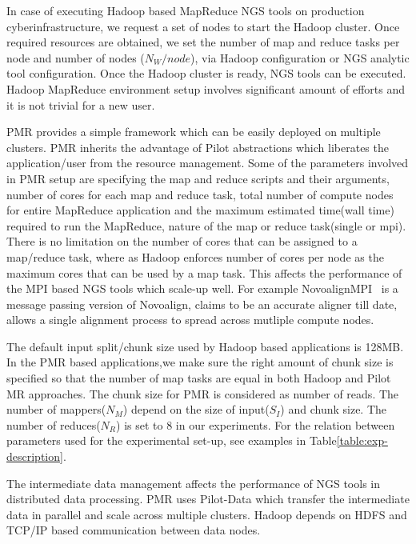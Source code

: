 \documentclass{acm_proc_article-sp}
\begin{document}
In case of executing Hadoop based MapReduce NGS tools on production cyberinfrastructure, we request a set of nodes to start the Hadoop cluster. Once 
required resources are obtained, we set the number of map and reduce tasks per node and number of nodes ($N_{W}/node$),  via Hadoop configuration or NGS analytic tool configuration.  Once the Hadoop cluster is ready, NGS tools can be executed. Hadoop MapReduce environment setup involves significant amount of efforts and it is not trivial for a new user. 

PMR provides a simple framework which can be easily deployed on multiple clusters. PMR inherits the advantage of Pilot abstractions which liberates the application/user from the resource management. Some of the parameters involved in PMR setup are specifying the map and reduce scripts and their arguments, number of cores for each map and reduce task, total number of compute nodes for entire MapReduce application and the maximum estimated time(wall time) required to run the MapReduce, nature of the map or reduce task(single or mpi). There is no limitation on the number of cores that can be assigned to a map/reduce task, where as Hadoop enforces number of cores per node as the maximum cores that can be used by a map task. This affects the performance of the MPI based NGS tools which scale-up well. For example NovoalignMPI~\cite{novo-align} is a message passing version of Novoalign, claims to be an accurate aligner till date,  allows a single alignment process to spread across mutliple compute nodes. 

The default input split/chunk size used by Hadoop based applications is 128MB. In the PMR based applications,we make sure the right amount of chunk size is specified so that the number of map tasks are equal in both Hadoop and Pilot MR approaches. The chunk size  for PMR is considered as number of reads. The number of mappers($N_M$) depend on the size of input($S_I$) and chunk size. The number of reduces($N_R$) is set to 8 in our experiments. For the relation between parameters used for the experimental set-up, see examples in Table\ref{table:exp-description}.

The intermediate data management affects the performance of NGS tools in distributed data processing. PMR uses Pilot-Data which transfer the intermediate data in parallel and scale across multiple clusters. Hadoop depends on HDFS and TCP/IP based communication between data nodes. 

\end{document}

